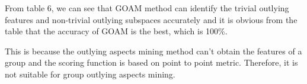 \documentclass[
 size=14pt,
 paper=smartboard,  %
 mode=present, 		%
 display=slides, 	%
 style=tuliplab,  	%
 pauseslide,
 fleqn,leqno]{powerdot}
\begin{document}


%


\begin{note}
From table $6$,
we can see that GOAM method can identify the trivial outlying features
and non-trivial outlying subspaces accurately and
it is obvious from the table that the accuracy of GOAM is the best,
which is 100\%.

This is because the outlying aspects mining method
can't obtain the features of a group and the scoring function
is based on point to point metric.
Therefore,
it is not suitable for group outlying aspects mining.
\end{note}



\end{document}
